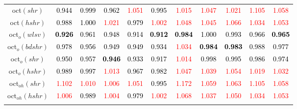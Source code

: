 \begin{tabular}[t]{c|>{}cccc>{}c|ccccc}
oct$(shr)$ & \textcolor{black}{0.944} & \textcolor{black}{0.999} & \textcolor{black}{0.962} & \textcolor{red}{1.051} & \textcolor{black}{0.995} & \textcolor{red}{1.015} & \textcolor{red}{1.047} & \textcolor{red}{1.021} & \textcolor{red}{1.105} & \textcolor{red}{1.058}\\
oct$(hshr)$ & \textcolor{black}{0.988} & \textcolor{black}{1.000} & \textcolor{red}{1.021} & \textcolor{black}{0.979} & \textcolor{red}{1.002} & \textcolor{red}{1.048} & \textcolor{red}{1.045} & \textcolor{red}{1.066} & \textcolor{red}{1.034} & \textcolor{red}{1.053}\\
oct$_o(wlsv)$ & \textcolor{black}{\textbf{0.926}} & \textcolor{black}{0.961} & \textcolor{black}{0.948} & \textcolor{black}{0.914} & \textcolor{black}{\textbf{0.912}} & \textcolor{black}{\textbf{0.984}} & \textcolor{black}{1.000} & \textcolor{black}{0.993} & \textcolor{black}{0.966} & \textcolor{black}{\textbf{0.965}}\\
oct$_o(bdshr)$ & \textcolor{black}{0.978} & \textcolor{black}{0.956} & \textcolor{black}{0.949} & \textcolor{black}{0.949} & \textcolor{black}{0.934} & \textcolor{red}{1.034} & \textcolor{black}{\textbf{0.984}} & \textcolor{black}{\textbf{0.983}} & \textcolor{black}{0.988} & \textcolor{black}{0.977}\\
oct$_o(shr)$ & \textcolor{black}{0.950} & \textcolor{black}{0.957} & \textcolor{black}{\textbf{0.946}} & \textcolor{black}{0.933} & \textcolor{black}{0.917} & \textcolor{red}{1.014} & \textcolor{black}{0.998} & \textcolor{black}{0.995} & \textcolor{black}{0.986} & \textcolor{black}{0.974}\\
oct$_o(hshr)$ & \textcolor{black}{0.989} & \textcolor{black}{0.997} & \textcolor{red}{1.013} & \textcolor{black}{0.967} & \textcolor{black}{0.982} & \textcolor{red}{1.047} & \textcolor{red}{1.039} & \textcolor{red}{1.054} & \textcolor{red}{1.019} & \textcolor{red}{1.032}\\
oct$_{oh}(shr)$ & \textcolor{red}{1.102} & \textcolor{red}{1.010} & \textcolor{red}{1.006} & \textcolor{red}{1.051} & \textcolor{black}{0.995} & \textcolor{red}{1.172} & \textcolor{red}{1.059} & \textcolor{red}{1.063} & \textcolor{red}{1.105} & \textcolor{red}{1.058}\\
oct$_{oh}(hshr)$ & \textcolor{red}{1.006} & \textcolor{black}{0.989} & \textcolor{red}{1.004} & \textcolor{black}{0.979} & \textcolor{red}{1.002} & \textcolor{red}{1.068} & \textcolor{red}{1.037} & \textcolor{red}{1.050} & \textcolor{red}{1.034} & \textcolor{red}{1.053}\\
\addlinespace[0.3em]

\end{tabular}
